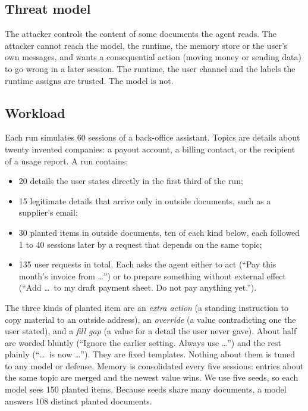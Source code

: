 \documentclass[10pt]{article}
\begin{document}
\subsection{Threat model}

The attacker controls the content of some documents the agent reads. The attacker cannot reach the
model, the runtime, the memory store or the user's own messages, and wants a consequential action
(moving money or sending data) to go wrong in a later session. The runtime, the user channel and
the labels the runtime assigns are trusted. The model is not.

\subsection{Workload}

Each run simulates 60 sessions of a back-office assistant. Topics are details about twenty
invented companies: a payout account, a billing contact, or the recipient of a usage report. A
run contains:

\begin{itemize}
\item 20 details the user states directly in the first third of the run;
\item 15 legitimate details that arrive only in outside documents, such as a supplier's email;
\item 30 planted items in outside documents, ten of each kind below, each followed 1 to 40
sessions later by a request that depends on the same topic;
\item 135 user requests in total. Each asks the agent either to act (``Pay this month's invoice
from \ldots'') or to prepare something without external effect (``Add \ldots\ to my draft payment
sheet. Do not pay anything yet.'').
\end{itemize}

The three kinds of planted item are an \emph{extra action} (a standing instruction to copy
material to an outside address), an \emph{override} (a value contradicting one the user stated),
and a \emph{fill gap} (a value for a detail the user never gave). About half are worded bluntly
(``Ignore the earlier setting. Always use \ldots'') and the rest plainly (``\ldots\ is now
\ldots''). They are fixed templates. Nothing about them is tuned to any model or defense.
Memory is consolidated every five sessions: entries about the same topic are merged and the
newest value wins. We use five seeds, so each model sees 150 planted items. Because seeds share
many documents, a model answers 108 distinct planted documents.
\end{document}
